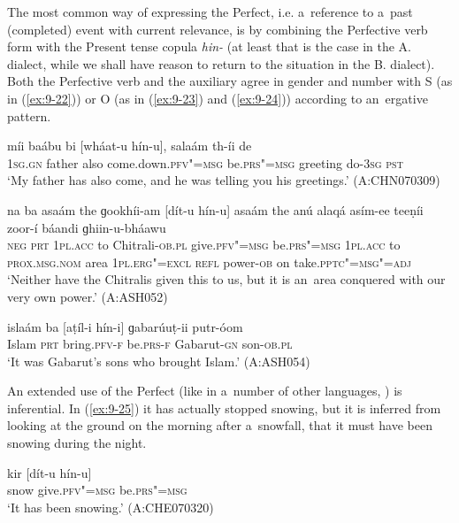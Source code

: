 The most common way of expressing the Perfect, i.e. a~reference to a~past (completed) event with current relevance, is by combining the Perfective verb form with the Present tense copula \textit{hin-} (at least that is the case in the A. dialect, while we shall have reason to return to the situation in the B. dialect). Both the Perfective verb and the auxiliary agree in gender and number with S (as in (\ref{ex:9-22})) or O (as in (\ref{ex:9-23}) and (\ref{ex:9-24})) according to an~ergative pattern.

\begin{exe}
\ex
\label{ex:9-22}
\gll míi baábu bi [wháat-u hín-u], salaám th-íi de \\
\textsc{1sg.gn} father also come.down.\textsc{pfv"=msg} be.\textsc{prs"=msg} greeting do-\textsc{3sg} \textsc{pst} \\
\glt `My father has also come, and he was telling you his greetings.' (A:CHN070309)

\ex
\label{ex:9-23}
\gll na ba asaám the ɡookhíi-am [dít-u hín-u] asaám the anú alaqá asím-ee teeṇíi zoor-í báandi ɡhiin-u-bháawu \\
\textsc{neg} \textsc{prt} \textsc{1pl.acc} to Chitrali-\textsc{ob.pl} give.\textsc{pfv"=msg}  be.\textsc{prs"=msg } \textsc{1pl.acc} to \textsc{prox.msg.nom} area  \textsc{1pl.erg"=excl} \textsc{refl} power-\textsc{ob} on take.\textsc{pptc"=msg"=adj} \\
\glt `Neither have the Chitralis given this to us, but it is an~area conquered with our very own power.' (A:ASH052)

\ex
\label{ex:9-24}
\gll islaám ba [aṭíl-i hín-i] ɡabarúuṭ-ii putr-óom \\
Islam \textsc{prt} bring.\textsc{pfv-f} be.\textsc{prs-f} Gabarut-\textsc{gn} son-\textsc{ob.pl} \\
\glt `It was Gabarut's sons who brought Islam.' (A:ASH054) 
\end{exe}

An extended use of the Perfect (like in a~number of other languages, \citealt[152]{dahl1985}) is inferential. In (\ref{ex:9-25}) it has actually stopped snowing, but it is inferred from looking at the ground on the morning after a~snowfall, that it must have been snowing during the night.

\begin{exe}
\ex
\label{ex:9-25}
\gll kir [dít-u hín-u] \\
snow give.\textsc{pfv"=msg} be.\textsc{prs"=msg} \\
\glt `It has been snowing.' (A:CHE070320)
\end{exe}

